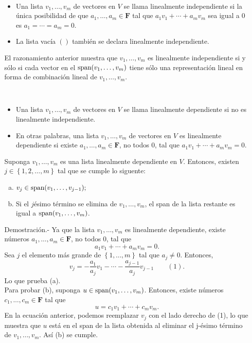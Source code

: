 \begin{mydef}\,\\
    \begin{itemize}
	\item Una lista $v_1,\ldots,v_m$ de vectores en $V$ se llama linealmente independiente si la única posibilidad de que  $a_1,\ldots,a_m\in \textbf{F}$ tal que $a_1v_1+\cdots+a_mv_m$ sea igual a $0$ es $a_1=\cdots=a_m=0.$
	\item La lista vacía $()$ también se declara linealmente independiente.
    \end{itemize}
\end{mydef}

El razonamiento anterior muestra que $v_1,\ldots,v_m$ es linealmente independiente si y sólo si cada vector en el $\mathop{\mbox{\normalfont span}}\nolimits(v_1,\ldots,v_m)$ tiene sólo una representación lineal en forma de combinación lineal de $v_1,\ldots,v_m$.

\setcounter{mydef}{18}
\begin{mydef}\,\\
    \begin{itemize}
	\item Una lista $v_1,\ldots,v_m$ de vectores en $V$ se llama linealmente dependiente si no es linealmente independiente.
	\item En otras palabras, una lista $v_1,\ldots,v_m$ de vectores en $V$ es linealmente dependiente si existe $a_1,\ldots,a_m\in \textbf{F}$, no todos $0$, tal que $a_1v_1+\cdots+a_mv_m=0$.
    \end{itemize}
\end{mydef}

\setcounter{mylema}{20}
\begin{mylema}
    Suponga $v_1,\ldots,v_m$ es una lista linealmente dependiente en $V$. Entonces, existen $j\in\left\{1,2,\ldots,m\right\}$ tal que se cumple lo siguente:
    \begin{enumerate}[(a)]
	\item $v_j\in \mathop{\mbox{\normalfont span}}\nolimits(v_1,\ldots,v_{j-1});$
	\item Si el $j$ésimo término se elimina de $v_1,\ldots,v_m$, el span de la lista restante es igual a $\mathop{\mbox{\normalfont span}}\nolimits(v_1,\ldots,v_m)$.\\
    \end{enumerate}
    Demostración.-\; Ya que la lista $v_1,\ldots,v_m$ es linealmente dependiente, existe números $a_1,\ldots,a_m\in \textbf{F}$, no todos $0$, tal que
    $$a_1v_1+\cdots + a_mv_m=0.$$
    Sea $j$ el elemento más grande de $\left\{1,\ldots, m\right\}$ tal que $a_j\neq 0$. Entonces,
    $$v_j=-\dfrac{a_1}{a_j}v_1-\cdots-\dfrac{a_{j-1}}{a_j}v_{j-1}\qquad (1).$$
    Lo que prueba (a). \\
    Para probar (b), suponga $u\in \mathop{\mbox{\normalfont span}}\nolimits(v_1,\ldots,v_m)$. Entonces, existe números $c_1,\ldots,c_m\in \textbf{F}$ tal que
    $$u=c_1v_1+\cdots+c_mv_m.$$
    En la ecuación anterior, podemos reemplazar $v_j$ con el lado derecho de (1), lo que muestra que $u$ está en el span de la lista obtenida al eliminar el j-ésimo término de $v_1,\ldots,v_m$. Así (b) se cumple.
\end{mylema}

